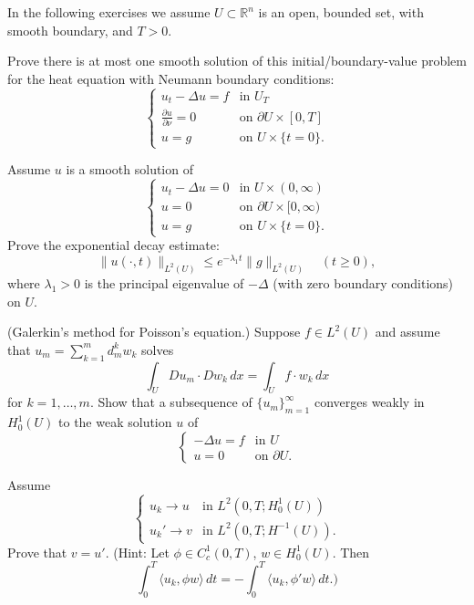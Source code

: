 In the following exercises we assume $U \subset \mathbb{R}^n$ is an open, bounded set, with smooth boundary, and $T > 0$.

\begin{exercise}
Prove there is at most one smooth solution of this initial/boundary-value problem for the heat equation with Neumann boundary conditions:
\[
\begin{cases}
u_t - \Delta u = f & \text{in } U_T \\
\frac{\partial u}{\partial \nu} = 0 & \text{on } \partial U \times [0,T] \\
u = g & \text{on } U \times \{t = 0\}.
\end{cases}
\]
\end{exercise}

\begin{exercise}
Assume $u$ is a smooth solution of
\[
\begin{cases}
u_t - \Delta u = 0 & \text{in } U \times (0,\infty) \\
u = 0 & \text{on } \partial U \times [0,\infty) \\
u = g & \text{on } U \times \{t = 0\}.
\end{cases}
\]
Prove the exponential decay estimate:
\[
\|u(\cdot,t)\|_{L^2(U)} \le e^{-\lambda_1 t}\|g\|_{L^2(U)} \quad (t \ge 0),
\]
where $\lambda_1 > 0$ is the principal eigenvalue of $-\Delta$ (with zero boundary conditions) on $U$.
\end{exercise}

\begin{exercise}
(Galerkin's method for Poisson's equation.) Suppose $f \in L^2(U)$ and assume that $u_m = \sum_{k=1}^m d_m^k w_k$ solves
\[
\int_U Du_m \cdot Dw_k \, dx = \int_U f \cdot w_k \, dx
\]
for $k = 1,\ldots,m$. Show that a subsequence of $\{u_m\}_{m=1}^\infty$ converges weakly in $H_0^1(U)$ to the weak solution $u$ of
\[
\begin{cases}
-\Delta u = f & \text{in } U \\
u = 0 & \text{on } \partial U.
\end{cases}
\]
\end{exercise}

\begin{exercise}
Assume
\[
\begin{cases}
u_k \to u & \text{in } L^2(0,T;H_0^1(U)) \\
u_k' \to v & \text{in } L^2(0,T;H^{-1}(U)).
\end{cases}
\]
Prove that $v = u'$. (Hint: Let $\phi \in C_c^1(0,T)$, $w \in H_0^1(U)$. Then
\[
\int_0^T \langle u_k, \phi w \rangle \, dt = -\int_0^T \langle u_k, \phi' w \rangle \, dt.)
\]
\end{exercise}

